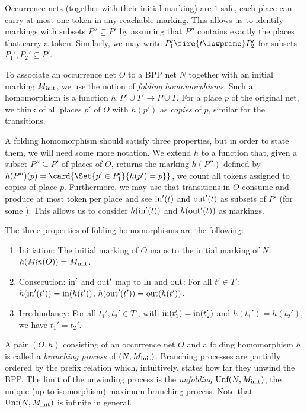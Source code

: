 \documentclass[../../diss.tex]{subfiles}
\begin{document}
Occurrence nets (together with their initial marking) are $1$-safe, \ie each place can carry at most one token in any reachable marking.
This allows us to identify markings with subsets $P'' \subseteq P'$ by assuming that $P''$ contains exactly the places that carry a token.
Similarly, we may write $P_1'\fire{t\lowprime}P_2'$ for subsets $P_1', P_2'\subseteq P'$.

To associate an occurrence net $O$ to a BPP net $N$ together with an initial marking $M_{\text{init}}$, we use the notion of \emph{folding homomorphisms}.
Such a homomorphism is a function $h:P' \cup T' \rightarrow P \cup T$.
For a place $p$ of the original net, we think of all places $p'$ of $O$ with $h(p')$ as \emph{copies} of $p$, similar for the transitions.

A folding homomorphism should satisfy three properties, but in order to state them, we will need some more notation.
We extend $h$ to a function that, given a subset $P'' \subseteq P'$ of places of $O$, returns the marking $h(P'')$ defined by $h(P'')(p) = \card{\Set{p'\in P_1'}{h(p')=p}}$, \ie we count all tokens assigned to copies of place $p$.
Furthermore, we may use that transitions in $O$ consume and produce at most token per place and see $\text{in}'(t)$ and $\text{out}'(t)$ as subsets of $P'$ (for some ).
This allows us to consider $h(\text{in}'(t))$ and $h(\text{out}'(t))$ as markings.

%
\cheatpagebreak
%

The three properties of folding homomorphisms are the following:

\begin{enumerate}[(1)]
     \item
         Initiation:
         The initial marking of $O$ maps to the initial marking of $N$,
         $h(\mathit{Min}(O))=M_{\text{init}}$.
     \item\label{Property:FoldingHomomorphismConsecution}
         Consecution: $\text{in}'$ and $\text{out}'$ map to $\text{in}$ and $\text{out}$:
         For all $t'\in T'$:
         $h(\text{in}'(t')) = \text{in}(h(t'))$, $h(\text{out}'(t')) = \text{out}(h(t'))$.
     \item
         Irredundancy:
         For all $t_1',t_2' \in T'$, with $\text{in}(t_1') = \text{in}(t_2')$ and $h(t_1') = h(t_2')$, we have $t_1' = t_2'$.
\end{enumerate}

A pair $(O,h)$ consisting of an occurrence net $O$ and a folding homomorphism $h$ is called a \emph{branching process} of $(N, M_{\text{init}})$.
Branching processes are partially ordered by the prefix relation which, intuitively, states how far they unwind the BPP.\@
The limit of the unwinding process is the \emph{unfolding} $\text{Unf}(N, M_{\text{init}})$, the unique (up to isomorphism) maximum branching process.
Note that $\text{Unf}(N, M_{\text{init}})$ is infinite in general.
\end{document}
